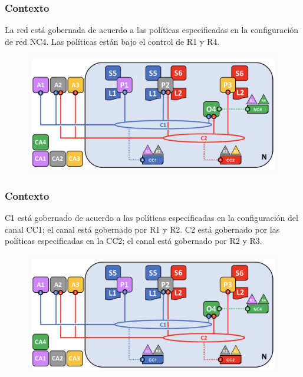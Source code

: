 \documentclass{beamer}
\begin{document}
	\begin{frame}
		\frametitle{Contexto}
		La red está gobernada de acuerdo a las políticas especificadas en la configuración de red NC4. Las políticas están bajo el control de R1 y R4.
		\begin{figure}[h]
			\includegraphics[scale=.3]{start_01}
			\centering
		\end{figure}
	\end{frame}
	
	\begin{frame}
		\frametitle{Contexto}
		C1 está gobernado de acuerdo a las políticas especificadas en la configuración del canal CC1; el canal está gobernado por R1 y R2. C2 está gobernado por las políticas especificadas en la CC2; el canal está gobernado por R2 y R3.
		\begin{figure}[h]
			\includegraphics[scale=.3]{start_01}
			\centering
		\end{figure}
	\end{frame}
	
\end{document}
